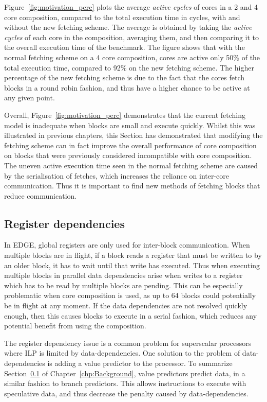 Figure~\ref{fig:motivation_perc} plots the average \textit{active cycles} of cores in a 2 and 4 core composition, compared to the total execution time in cycles, with and without the new fetching scheme.
The average is obtained by taking the \textit{active cycles} of each core in the composition, averaging them, and then comparing it to the overall execution time of the benchmark.
The figure shows that with the normal fetching scheme on a 4 core composition, cores are active only 50\% of the total execution time, compared to 92\% on the new fetching scheme.
The higher percentage of the new fetching scheme is due to the fact that the cores fetch blocks in a round robin fashion, and thus have a higher chance to be active at any given point.

Overall, Figure~\ref{fig:motivation_perc} demonstrates that the current fetching model is inadequate when blocks are small and execute quickly.
Whilst this was illustrated in previous chapters, this Section has demonstrated that modifying the fetching scheme can in fact improve the overall performance of core composition on blocks that were previously considered incompatible with core composition.
The uneven active execution time seen in the normal fetching scheme are caused by the serialisation of fetches, which increases the reliance on inter-core communication.
Thus it is important to find new methods of fetching blocks that reduce communication.

\subsection{Register dependencies}

In EDGE, global registers are only used for inter-block communication.
When multiple blocks are in flight, if a block reads a register that must be written to by an older block, it has to wait until that write has executed.
Thus when executing multiple blocks in parallel data dependencies arise when writes to a register which has to be read by multiple blocks are pending.
This can be especially problematic when core composition is used, as up to 64 blocks could potentially be in flight at any moment.
If the data dependencies are not resolved quickly enough, then this causes blocks to execute in a serial fashion, which reduces any potential benefit from using the composition.

The register dependency issue is a common problem for superscalar processors~\cite{peraisVTAGE2014} where ILP is limited by data-dependencies.
One solution to the problem of data-dependencies is adding a value predictor to the processor.
To summarize Section~\ref{} of Chapter~\ref{chp:Background}, value predictors predict data, in a similar fashion to branch predictors.
This allows instructions to execute with speculative data, and thus decrease the penalty caused by data-dependencies.

